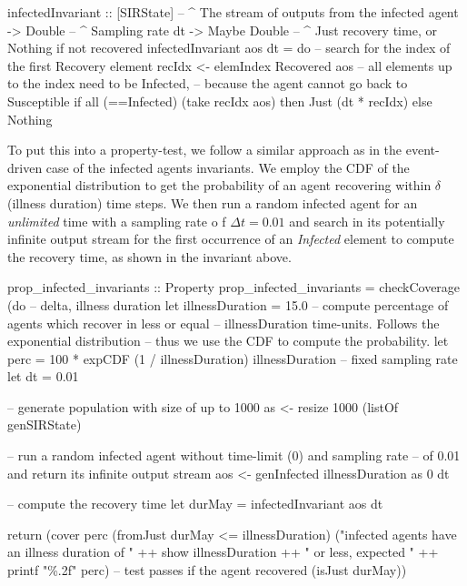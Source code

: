 \begin{HaskellCode}
infectedInvariant :: [SIRState]     -- ^ The stream of outputs from the infected agent
                  -> Double         -- ^ Sampling rate dt
                  -> Maybe Double   -- ^ Just recovery time, or Nothing if not recovered
infectedInvariant aos dt  = do
  -- search for the index of the first Recovery element
  recIdx <- elemIndex Recovered aos
  -- all elements up to the index need to be Infected,
  -- because the agent cannot go back to Susceptible
  if all (==Infected) (take recIdx aos)
    then Just (dt * recIdx)
    else Nothing
\end{HaskellCode}

To put this into a property-test, we follow a similar approach as in the event-driven case of the infected agents invariants. We employ the CDF of the exponential distribution to get the probability of an agent recovering within $\delta$ (illness duration) time steps. We then run a random infected agent for an \textit{unlimited} time with a sampling rate o f $\Delta t = 0.01$ and search in its potentially infinite output stream for the first occurrence of an \textit{Infected} element to compute the recovery time, as shown in the invariant above.

\begin{HaskellCode}
prop_infected_invariants :: Property
prop_infected_invariants = checkCoverage (do
   -- delta, illness duration
  let illnessDuration = 15.0
  -- compute percentage of agents which recover in less or equal 
  -- illnessDuration time-units. Follows the exponential distribution
  -- thus we use the CDF to compute the probability.
  let perc = 100 * expCDF (1 / illnessDuration) illnessDuration
  -- fixed sampling rate
  let dt = 0.01
  
  -- generate population with size of up to 1000
  as <- resize 1000 (listOf genSIRState)

  -- run a random infected agent without time-limit (0) and sampling rate
  -- of 0.01 and return its infinite output stream 
  aos <- genInfected illnessDuration as 0 dt

  -- compute the recovery time
  let durMay = infectedInvariant aos dt

  return (cover perc (fromJust durMay <= illnessDuration)
            ("infected agents have an illness duration of  " ++ show illnessDuration ++
            " or less, expected " ++ printf "\%.2f" perc)
            -- test passes if the agent recovered
            (isJust durMay))
\end{HaskellCode}

